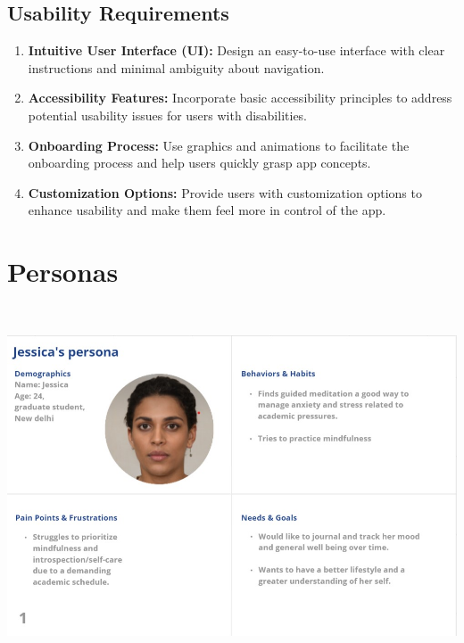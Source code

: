 \documentclass[manuscript,screen,review]{acmart}
\begin{document}
\subsection{Usability Requirements}
\begin{enumerate}
    \item \textbf{Intuitive User Interface (UI):} Design an easy-to-use interface with clear instructions and minimal ambiguity about navigation.
    \item \textbf{Accessibility Features:} Incorporate basic accessibility principles to address potential usability issues for users with disabilities.
    \item \textbf{Onboarding Process:} Use graphics and animations to facilitate the onboarding process and help users quickly grasp app concepts.
    \item \textbf{Customization Options:} Provide users with customization options to enhance usability and make them feel more in control of the app.
\end{enumerate}



\section{Personas}

    \includegraphics[width=6.26806in,height=4.19375in]{vertopal.com_Personas/vertopal_68c5e293405b4e92b3a0f3d4afe53fc3/media/image1.jpeg}
\end{document}
